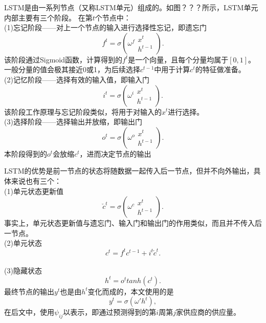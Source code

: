 LSTM是由一系列节点（又称LSTM单元）组成的。如图？？？所示，LSTM单元内部主要有三个阶段。
在第$t$个节点中：
\\
(1)忘记阶段——对上一个节点的输入进行选择性忘记，即遗忘门
\begin{equation}
    f^{t}=\sigma\left(\omega^{f} \begin{array}{l}
x^t \\
h^{t-1}
\end{array}\right).
\end{equation}
该阶段通过Sigmoid函数，计算得到的$f^{t}$是一个向量，且每个分量均属于$[0,1]$。
一般分量的值会极其接近0或1，为后续选择$c^{t-1}$中用于计算$c^t$的特征做准备。
\\
(2)记忆阶段——选择有效的输入值，即输入门
\begin{equation}
    i^{t}=\sigma\left(\omega^{i} \begin{array}{r}
x^t \\
h^{t-1}
\end{array}\right).
\end{equation}
该阶段工作原理与忘记阶段类似，将用于对输入的$x^t$进行选择。
\\
(3)选择阶段——选择输出并放缩，即输出门
\begin{equation}
    o^{t}=\sigma\left(\omega^{o} \begin{array}{r}
x^t \\
h^{t-1}
\end{array}\right).
\end{equation}
本阶段得到的$o^{t}$会放缩$c^t$，进而决定节点的输出

LSTM的优势是前一节点的状态将随数据一起传入后一节点，但并不向外输出，具体来说也有三个：
\\
(1)单元状态更新值
\begin{equation}
    \check{c}^t=\sigma\left(\omega^{c} \begin{array}{l}
x^t \\
h^{t-1}
\end{array}\right).
\end{equation}
事实上，单元状态更新值与遗忘门、输入门和输出门的作用类似，而且并不传入后一节点。
\\
(2)单元状态
\begin{equation}
c^t=f^tc^{t-1}+i^t\check{c}^t.
\end{equation}
\\
(3)隐藏状态
\begin{equation}
   h^t=o^ttanh(c^t).
\end{equation}
最终节点的输出$y^t$也是由$h^t$变化而成的，本文使用的是
\begin{equation}
y^t=\sigma(\omega'h^t),
\end{equation}
在后文中，使用$\psi_{i j}$以表示，即通过预测得到的第$i$周第$j$家供应商的供应量。


